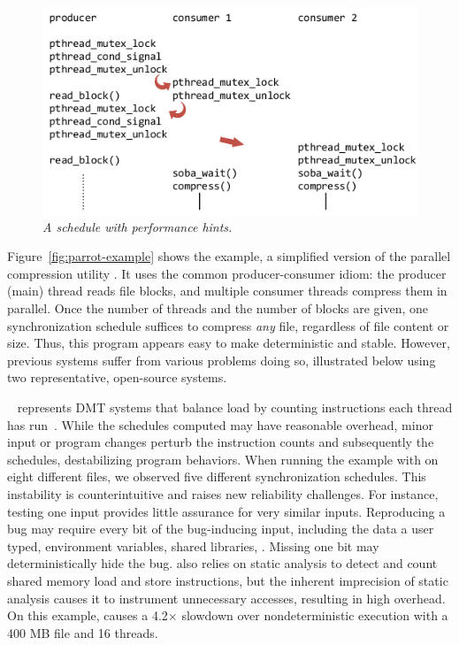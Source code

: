 \begin{figure}[t]
\centering
\includegraphics[width=0.6\columnwidth]{parrot/figures/parrot_schedule}
\vspace{-.2in}
\caption{{\em A \parrot schedule with performance
    hints.}}\label{fig:parrot-schedule}
\vspace{-.05in}
\end{figure}


Figure~\ref{fig:parrot-example} shows the example, a simplified version of the parallel
compression utility \pbzip\cite{pbzip2}.  It uses the common producer-consumer idiom:
the producer (main) thread reads file blocks, and multiple consumer
threads compress them in parallel.  Once the number of threads and the
number of blocks are given, one synchronization schedule suffices to
compress \emph{any} file, regardless of file content or size.  Thus, this program appears
easy to make deterministic and stable.  However, previous systems suffer from
various problems doing so, illustrated below using
two representative, open-source systems.


\coredet~\cite{coredet:asplos10} represents DMT systems that balance load
by counting instructions each thread has run~\cite{coredet:asplos10,
 kendo:asplos09, dmp:asplos09, dos:osdi10, ddos:asplos13}.  While the
schedules computed may have reasonable overhead, minor input or program
changes perturb the instruction counts and subsequently the schedules,
destabilizing program behaviors.  When running the example
with \coredet on eight different files, we observed
five different synchronization schedules.  This instability is
counterintuitive and raises new reliability challenges.  For instance,
testing one input provides little assurance for very similar inputs.
Reproducing a bug may require every bit of the bug-inducing input,
including the data a user typed, environment variables, shared libraries,
\etc. Missing one bit may deterministically hide the bug.  \coredet also
relies on static analysis to detect and count shared memory load and store
instructions, but the inherent imprecision of static analysis causes it to
instrument unnecessary accesses, resulting in high overhead.  On this
example, \coredet causes a 4.2$\times$ slowdown over nondeterministic execution with a 400
MB file and 16 threads.


